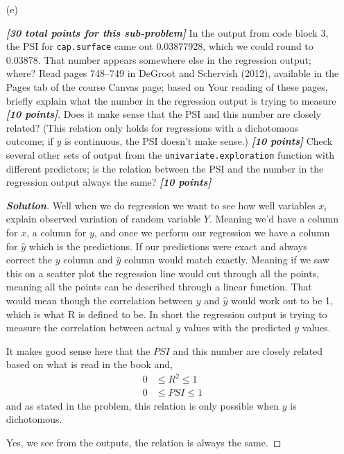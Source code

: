 \documentclass[12pt]{article}
\newenvironment{solution}{\begin{tcolorbox}[breakable]\begin{proof}[\textbf{\textit{Solution}}] }{\end{proof}\end{tcolorbox}}
\newcommand{\bi}[1]{\textbf{\textit{#1}}}
\begin{document}
\begin{itemize}
\item[(e)]

\bi{[30 total points for this sub-problem]} In the output from code block 3, the PSI for \texttt{cap.surface} came out 0.03877928, which we could round to 0.03878. That number appears somewhere else in the regression output; where? Read pages 748--749 in DeGroot and Schervish (2012), available in the Pages tab of the course Canvas page; based on Your reading of these pages, briefly explain what the number in the regression output is trying to measure \bi{[10 points]}. Does it make sense that the PSI and this number are closely related? (This relation only holds for regressions with a dichotomous outcome; if $y$ is continuous, the PSI doesn't make sense.) \bi{[10 points]} Check several other sets of output from the \texttt{univariate.exploration} function with different predictors; is the relation between the PSI and the number in the regression output always the same? \bi{[10 points]}

\begin{solution}
    Well when we do regression we want to see how well variables $x_i$ explain observed variation of random variable $Y$. Meaning we'd have a column for $x$, a column for $y$, and once we perform our regression we have a column for $\hat{y}$ which is the predictions. If our predictions were exact and always correct the $y$ column and $\hat{y}$ column would match exactly. Meaning if we saw this on a scatter plot the regression line would cut through all the points, meaning all the points can be described through a linear function. That would mean though the correlation between $y$ and $\hat{y}$ would work out to be 1, which is what R is defined to be. In short the regression output is trying to measure the correlation between actual $y$ values with the predicted $y$ values. 

    It makes good sense here that the $PSI$ and this number are closely related based on what is read in the book and, 
    \begin{align*}
        0 &\leq R^{2} \leq 1\\
        0 &\leq PSI \leq 1
    \end{align*}
    and as stated in the problem, this relation is only possible when $y$ is dichotomous. 

    Yes, we see from the outputs, the relation is always the same. 

\end{solution}

\end{itemize}
\end{document}
